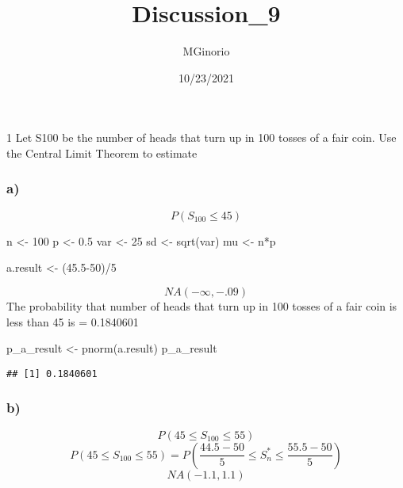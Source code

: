 \documentclass[
]{article}
\title{Discussion\_9}
\author{MGinorio}
\date{10/23/2021}
\newenvironment{Shaded}{\begin{snugshade}}{\end{snugshade}}
\newcommand{\DecValTok}[1]{\textcolor[rgb]{0.00,0.00,0.81}{#1}}
\newcommand{\FloatTok}[1]{\textcolor[rgb]{0.00,0.00,0.81}{#1}}
\newcommand{\FunctionTok}[1]{\textcolor[rgb]{0.00,0.00,0.00}{#1}}
\newcommand{\NormalTok}[1]{#1}
\newcommand{\OtherTok}[1]{\textcolor[rgb]{0.56,0.35,0.01}{#1}}
\newcommand{\SpecialCharTok}[1]{\textcolor[rgb]{0.00,0.00,0.00}{#1}}
\begin{document}
\maketitle

1 Let S100 be the number of heads that turn up in 100 tosses of a fair
coin. Use the Central Limit Theorem to estimate

\hypertarget{a}{%
\subsubsection{a)}\label{a}}

\[
P(S_{100}\leq 45)
\]

\begin{Shaded}
\begin{Highlighting}[]
\NormalTok{n }\OtherTok{\textless{}{-}} \DecValTok{100}
\NormalTok{p }\OtherTok{\textless{}{-}} \FloatTok{0.5}
\NormalTok{var }\OtherTok{\textless{}{-}} \DecValTok{25}
\NormalTok{sd }\OtherTok{\textless{}{-}} \FunctionTok{sqrt}\NormalTok{(var)}
\NormalTok{mu }\OtherTok{\textless{}{-}}\NormalTok{ n}\SpecialCharTok{*}\NormalTok{p}

\NormalTok{a.result }\OtherTok{\textless{}{-}}\NormalTok{ (}\FloatTok{45.5}\DecValTok{{-}50}\NormalTok{)}\SpecialCharTok{/}\DecValTok{5}
\end{Highlighting}
\end{Shaded}

\[
NA(- \infty, -.09)
\] The probability that number of heads that turn up in 100 tosses of a
fair coin is less than 45 is = 0.1840601

\begin{Shaded}
\begin{Highlighting}[]
\NormalTok{p\_a\_result }\OtherTok{\textless{}{-}} \FunctionTok{pnorm}\NormalTok{(a.result)}
\NormalTok{p\_a\_result}
\end{Highlighting}
\end{Shaded}

\begin{verbatim}
## [1] 0.1840601
\end{verbatim}

\hypertarget{b}{%
\subsubsection{b)}\label{b}}

\[
P(45 \leq S_{100}\leq 55)
\] \[
P(45 \leq S_{100}\leq 55) = P(\frac{44.5 - 50}{5}\leq S^*_{n} \leq \frac{55.5 - 50}{5} )
\] \[
NA(-1.1 , 1.1)
\]
\end{document}
